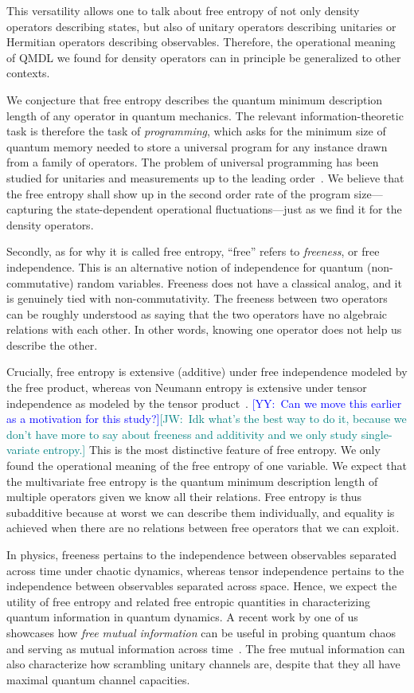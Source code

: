 \documentclass[aps,pre,twocolumn,superscriptaddress,amsmath,amssymb,reprint]{revtex4-2}
\newcommand{\JW}[1]{\textcolor{teal}{[JW:\ #1]}}
\newcommand{\YY}[1]{\textcolor{blue}{[YY:\ #1]}}
\begin{document}
This versatility allows one to talk about free entropy of not only density operators describing states, but also of unitary operators describing unitaries or Hermitian operators describing observables. Therefore, the operational meaning of QMDL we found for density operators can in principle be generalized to other contexts. 

We conjecture that free entropy describes the quantum minimum description length of any operator in quantum mechanics. The relevant information-theoretic task is therefore the task of \emph{programming}, which asks for the minimum size of quantum memory needed to store a universal program for any instance drawn from a family of operators. The problem of universal programming has been studied for unitaries and measurements up to the leading order~\cite{Kubicki_2019,yang2020optimal,DAriano_2005,PrezGarca_2006}. We believe that the free entropy shall show up in the second order rate of the program size—capturing the state-dependent operational fluctuations—just as we find it for the density operators.

Secondly, as for why it is called free entropy, ``free'' refers to \emph{freeness}, or free independence. This is an alternative notion of independence for quantum (non-commutative) random variables. Freeness does not have a classical analog, and it is genuinely tied with non-commutativity. The freeness between two operators can be roughly understood as saying that the two operators have no algebraic relations with each other. In other words, knowing one operator does not help us describe the other. 

Crucially, free entropy is extensive (additive) under free independence modeled by the free product, whereas von Neumann entropy is extensive under tensor independence as modeled by the tensor product~\cite{speicher1996universal}. \YY{Can we move this earlier as a motivation for this study?}\JW{Idk what's the best way to do it, because we don't have more to say about freeness and additivity and we only study single-variate entropy.} This is the most distinctive feature of free entropy. We only found the operational meaning of the free entropy of one variable. We expect that the multivariate free entropy is the quantum minimum description length of multiple operators given we know all their relations. Free entropy is thus subadditive because at worst we can describe them individually, and equality is achieved when there are no relations between free operators that we can exploit.

In physics, freeness pertains to the independence between observables separated across time under chaotic dynamics, whereas tensor independence pertains to the independence between observables separated across space. Hence, we expect the utility of free entropy and related free entropic quantities in characterizing quantum information in quantum dynamics. A recent work by one of us showcases how \emph{free mutual information} can be useful in probing quantum chaos and serving as mutual information across time~\cite{vardhan2025}. The free mutual information can also characterize how scrambling unitary channels are, despite that they all have maximal quantum channel capacities.
\end{document}
